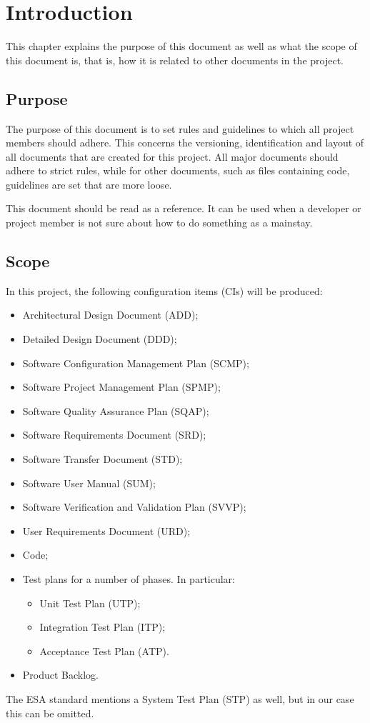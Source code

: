 \chapter{Introduction}
\label{chap:introduction}
This chapter explains the purpose of this document as well as what the scope of this document is, that is, how it is related to other documents in the project.

\section{Purpose}
The purpose of this document is to set rules and guidelines to which all project members should adhere. This concerns the versioning, identification and layout of all documents that are created for this project. All major documents should adhere to strict rules, while for other documents, such as files containing code, guidelines are set that are more loose.

This document should be read as a reference. It can be used when a developer or project member is not sure about how to do something as a mainstay.

\section{Scope}
In this project, the following configuration items (CIs) will be produced:
\begin{itemize}
	\item Architectural Design Document (ADD);
	\item Detailed Design Document (DDD);
	\item Software Configuration Management Plan (SCMP);
	\item Software Project Management Plan (SPMP);
	\item Software Quality Assurance Plan (SQAP);
	\item Software Requirements Document (SRD);
	\item Software Transfer Document (STD);
	\item Software User Manual (SUM);
	\item Software Verification and Validation Plan (SVVP);
	\item User Requirements Document (URD);
	\item Code;
	\item Test plans for a number of phases. In particular:
	\begin{itemize}
		\item Unit Test Plan (UTP);
		\item Integration Test Plan (ITP);
		\item Acceptance Test Plan (ATP).
	\end{itemize}
	\item Product Backlog.
\end{itemize}
The ESA standard mentions a System Test Plan (STP) as well, but in our case this can be omitted.

